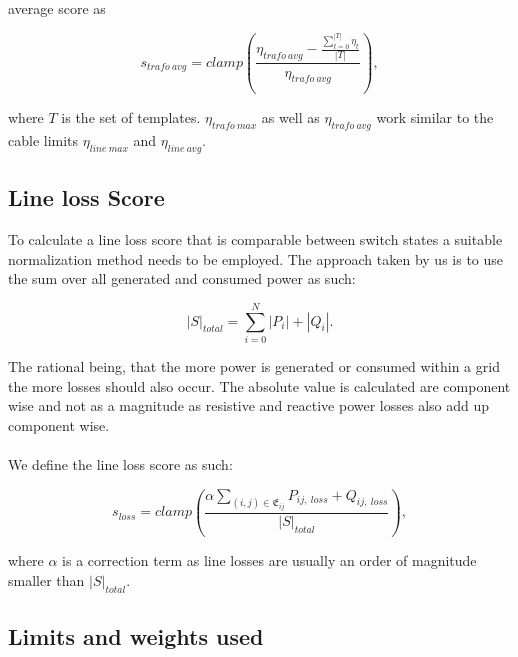 average score as

\begin{equation}
    s_{trafo \ avg} = clamp(\frac{\eta_{trafo \ avg} - \frac{\sum_{t = 0}^{|T|} \eta_t}{|T|}}{\eta_{trafo \ avg}}),
\end{equation}

where $T$ is the set of templates. $\eta_{trafo \ max}$ as well as $\eta_{trafo \ avg}$ 
work similar to the cable limits $\eta_{line \ max}$ and $\eta_{line \ avg}$.

\subsection{Line loss Score}

To calculate a line loss score that is comparable between switch states a suitable
normalization method needs to be employed. The approach taken by us is to use the 
sum over all generated and consumed power as such:

\begin{equation}
    |S|_{total} = \sum_{i=0}^N |P_i| + |Q_i|.
\end{equation}

The rational being, that the more power is generated
or consumed within a grid
the more losses should also occur. 
The absolute value is calculated are component wise
and not as a magnitude as resistive and reactive 
power losses also add up component wise.\\
\\
We define the line loss score as such:

\begin{equation}
    s_{loss} = clamp(\frac{\alpha \sum_{(i, j) \in \mathfrak{E}_{ij}} P_{ij, \ loss} + Q_{ij, \ loss}}{|S|_{total}}),
\end{equation}

where $\alpha$ is a correction term as line losses are usually an order of magnitude
smaller than $|S|_{total}$.

\subsection{Limits and weights used}

